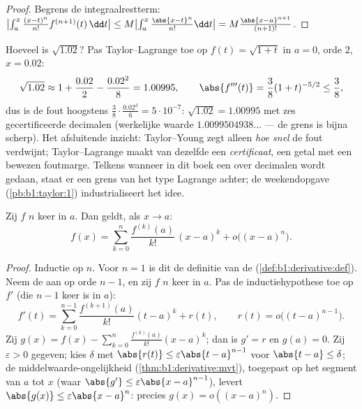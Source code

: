 \begin{proof}
Begrens de integraalrestterm: $\bigl|\int_a^x \frac{(x-t)^n}{n!}
f^{(n+1)}(t)\,\dd t\bigr| \leq M \bigl|\int_a^x
\frac{\abs{x-t}^n}{n!}\dd t\bigr| =
M\frac{\abs{x-a}^{n+1}}{(n+1)!}$.
\end{proof}

\begin{example}\label{ex:b1:taylor:certified}
Hoeveel is $\sqrt{1.02}$? Pas Taylor--Lagrange toe op $f(t) =
\sqrt{1 + t}$ in $a = 0$, orde $2$, $x = 0.02$:
\[
\sqrt{1.02} \approx 1 + \frac{0.02}{2} - \frac{0.02^2}{8}
= 1.00995 ,
\qquad
\abs{f'''(t)} = \frac{3}{8}(1+t)^{-5/2} \leq \frac 38 ,
\]
dus is de fout hoogstens $\frac38 \cdot \frac{0.02^3}{6} =
5\cdot10^{-7}$: $\sqrt{1.02} = 1.00995$ met zes gecertificeerde
decimalen (werkelijke waarde $1.0099504938\dots$ --- de grens is
bijna scherp). Het afsluitende inzicht: Taylor--Young zegt alleen
\emph{hoe snel} de fout verdwijnt; Taylor--Lagrange maakt van
dezelfde  een \emph{certificaat}, een getal met een
bewezen foutmarge. Telkens wanneer in dit boek een  over
decimalen wordt gedaan, staat er een grens van het type Lagrange
achter; de weekendopgave (\cref{pb:b1:taylor:1})
industrialiseert het idee.
\end{example}

\begin{theorem}\label{thm:b1:taylor:young}
Zij $f$ $n$ keer  in $a$. Dan geldt, als $x \to a$:
\[
f(x) = \sum_{k=0}^{n} \frac{f^{(k)}(a)}{k!}\,(x-a)^k
+ o\bigl((x-a)^n\bigr) .
\]
\end{theorem}

\begin{proof}
Inductie op $n$. Voor $n = 1$ is dit de definitie van de 
(\cref{def:b1:derivative:def}). Neem de  aan op orde $n -
1$, en zij $f$ $n$ keer  in $a$. Pas de inductiehypothese
toe op $f'$ (die $n-1$ keer  is in $a$):
\[
f'(t) = \sum_{k=0}^{n-1} \frac{f^{(k+1)}(a)}{k!}(t-a)^k + r(t),
\qquad r(t) = o\bigl((t-a)^{n-1}\bigr).
\]
Zij $g(x) = f(x) - \sum_{k=0}^{n} \frac{f^{(k)}(a)}{k!}(x-a)^k$; dan
is $g' = r$ en $g(a) = 0$. Zij $\varepsilon > 0$ gegeven; kies
$\delta$ met $\abs{r(t)} \leq \varepsilon\abs{t - a}^{n-1}$ voor
$\abs{t-a} \leq \delta$; de middelwaarde-ongelijkheid
(\cref{thm:b1:derivative:mvt}), toegepast op het segment van $a$ tot
$x$ (waar $\abs{g'} \leq \varepsilon\abs{x-a}^{n-1}$), levert
$\abs{g(x)} \leq \varepsilon\abs{x - a}^n$: precies $g(x) =
o((x-a)^n)$.
\end{proof}

